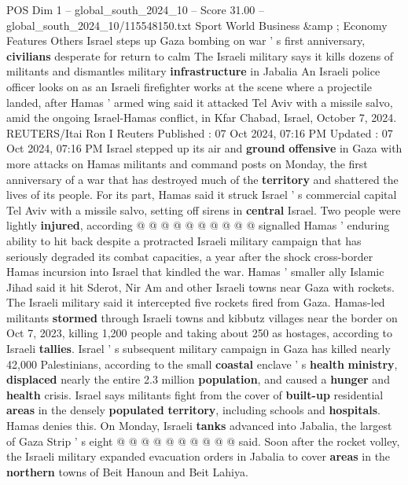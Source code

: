 \begin{textsample}{POS Dim 1 – global\_south\_2024\_10 – Score 31.00 – global\_south\_2024\_10/115548150.txt}  \label{ex:f1_pos_170}
Sport World Business \&amp ; Economy Features Others Israel steps up Gaza bombing on war ' s first anniversary, \textbf{civilians} desperate for return to calm The Israeli military says it kills dozens of militants and dismantles military \textbf{infrastructure} in Jabalia An Israeli police officer looks on as an Israeli firefighter works at the scene where a projectile landed, after Hamas ' armed wing said it attacked Tel Aviv with a missile salvo, amid the ongoing Israel-Hamas conflict, in Kfar Chabad, Israel, October 7, 2024.
REUTERS/Itai Ron I Reuters Published : 07 Oct 2024, 07:16 PM Updated : 07 Oct 2024, 07:16 PM Israel stepped up its air and \textbf{ground} \textbf{offensive} in Gaza with more attacks on Hamas militants and command posts on Monday, the first anniversary of a war that has destroyed much of the \textbf{territory} and shattered the lives of its people.
For its part, Hamas said it struck Israel ' s commercial capital Tel Aviv with a missile salvo, setting off sirens in \textbf{central} Israel.
Two people were lightly \textbf{injured}, according @ @ @ @ @ @ @ @ @ @ signalled Hamas ' enduring ability to hit back despite a protracted Israeli military campaign that has seriously degraded its combat capacities, a year after the shock cross-border Hamas incursion into Israel that kindled the war.
Hamas ' smaller ally Islamic Jihad said it hit Sderot, Nir Am and other Israeli towns near Gaza with rockets.
The Israeli military said it intercepted five rockets fired from Gaza.
Hamas-led militants \textbf{stormed} through Israeli towns and kibbutz villages near the border on Oct 7, 2023, killing 1,200 people and taking about 250 as hostages, according to Israeli \textbf{tallies}.
Israel ' s subsequent military campaign in Gaza has killed nearly 42,000 Palestinians, according to the small \textbf{coastal} enclave ' s \textbf{health} \textbf{ministry}, \textbf{displaced} nearly the entire 2.3 million \textbf{population}, and caused a \textbf{hunger} and \textbf{health} crisis.
Israel says militants fight from the cover of \textbf{built-up} residential \textbf{areas} in the densely \textbf{populated} \textbf{territory}, including schools and \textbf{hospitals}.
Hamas denies this.
On Monday, Israeli \textbf{tanks} advanced into Jabalia, the largest of Gaza Strip ' s eight @ @ @ @ @ @ @ @ @ @ said.
Soon after the rocket volley, the Israeli military expanded evacuation orders in Jabalia to cover \textbf{areas} in the \textbf{northern} towns of Beit Hanoun and Beit Lahiya.

\end{textsample}

